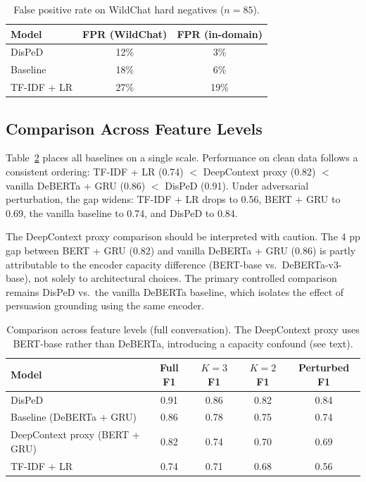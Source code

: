 \documentclass[11pt,a4paper]{article}
\begin{document}
\begin{table}[t]
\centering
\small
\caption{False positive rate on WildChat hard negatives ($n{=}85$).}
\label{tab:wildchat}
\begin{tabular}{lcc}
\toprule
\textbf{Model} & \textbf{FPR (WildChat)} & \textbf{FPR (in-domain)} \\
\midrule
DisPeD & 12\% & 3\% \\
Baseline & 18\% & 6\% \\
TF-IDF + LR & 27\% & 19\% \\
\bottomrule
\end{tabular}
\end{table}

\subsection{Comparison Across Feature Levels}
\label{sec:hierarchy}

Table~\ref{tab:hierarchy} places all baselines on a single scale.
Performance on clean data follows a consistent ordering: TF-IDF + LR (0.74) $<$ DeepContext proxy (0.82) $<$ vanilla DeBERTa + GRU (0.86) $<$ DisPeD (0.91).
Under adversarial perturbation, the gap widens: TF-IDF + LR drops to 0.56, BERT + GRU to 0.69, the vanilla baseline to 0.74, and DisPeD to 0.84.

The DeepContext proxy comparison should be interpreted with caution.
The 4 pp gap between BERT + GRU (0.82) and vanilla DeBERTa + GRU (0.86) is partly attributable to the encoder capacity difference (BERT-base vs.\ DeBERTa-v3-base), not solely to architectural choices.
The primary controlled comparison remains DisPeD vs.\ the vanilla DeBERTa baseline, which isolates the effect of persuasion grounding using the same encoder.

\begin{table}[t]
\centering
\small
\caption{Comparison across feature levels (full conversation). The DeepContext proxy uses BERT-base rather than DeBERTa, introducing a capacity confound (see text).}
\label{tab:hierarchy}
\begin{tabular}{lcccc}
\toprule
\textbf{Model} & \textbf{Full F1} & \textbf{$K{=}3$ F1} & \textbf{$K{=}2$ F1} & \textbf{Perturbed F1} \\
\midrule
DisPeD & 0.91 & 0.86 & 0.82 & 0.84 \\
Baseline (DeBERTa + GRU) & 0.86 & 0.78 & 0.75 & 0.74 \\
DeepContext proxy (BERT + GRU) & 0.82 & 0.74 & 0.70 & 0.69 \\
TF-IDF + LR & 0.74 & 0.71 & 0.68 & 0.56 \\
\bottomrule
\end{tabular}
\end{table}
\end{document}
